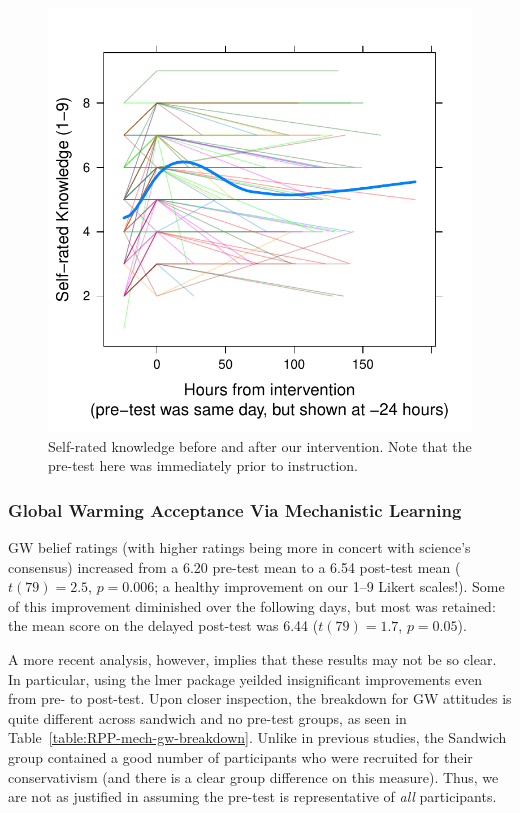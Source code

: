 \begin{figure}
    \centering
    \includegraphics{RPP-mech-self.pdf}
    \caption{Self-rated knowledge before and after our intervention. Note that the
        pre-test here was immediately prior to instruction.}
\end{figure}

\subsubsection{Global Warming Acceptance Via Mechanistic Learning}

GW belief ratings (with higher ratings being more in concert with science’s
consensus) increased from a 6.20 pre-test mean to a 6.54 post-test mean
($t(79)=2.5$, $p=0.006$; a healthy improvement on our 1--9 Likert scales!). Some
of this improvement diminished over the following days, but most was retained:
the mean score on the delayed post-test was 6.44 ($t(79)=1.7$, $p=0.05$). 

A more recent analysis, however, implies that these results may not be so clear.
In particular, using the \textsf{lmer} package yeilded insignificant
improvements even from pre- to post-test. Upon closer inspection, the breakdown
for GW attitudes is quite different across sandwich and no pre-test groups, as
seen in Table~\ref{table:RPP-mech-gw-breakdown}. Unlike in previous studies,
the Sandwich group contained a good number of participants who were recruited
for their conservativism (and there is a clear group difference on this
measure). Thus, we are not as justified in assuming the pre-test is
representative of \emph{all} participants.

